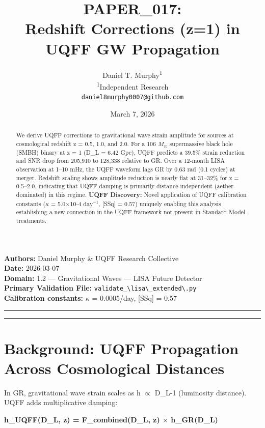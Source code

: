 \documentclass[12pt,a4paper]{article}
\title{\textbf{PAPER\_017: \\ Redshift Corrections (z=1) in UQFF GW Propagation}}
\author{
Daniel T. Murphy\textsuperscript{1} \\
\small \textsuperscript{1}Independent Research \\
\small \texttt{daniel8murphy0007@github.com}
}
\date{March 7, 2026}
\begin{document}
\maketitle

\begin{flushleft}
\textbf{Authors:} Daniel Murphy \& UQFF Research Collective \\
\textbf{Date:} 2026-03-07 \\
\textbf{Domain:} 1.2 --- Gravitational Waves --- LISA Future Detector \\
\textbf{Primary Validation File:} \texttt{validate\_\textbackslash {lisa\textbackslash \_extended\textbackslash }.py} \\
\textbf{Calibration constants:} $\kappa$ = 0.0005/day, [SSq] = 0.57 \\
\end{flushleft}

\medskip\hrule\medskip

\begin{abstract}
We derive UQFF corrections to gravitational wave strain amplitude for sources at cosmological redshift z = 0.5, 1.0, and 2.0. For a 106 $M_{\odot}$ supermassive black hole (SMBH) binary at z = 1 (D\_L = 6.42 Gpc), UQFF predicts a 39.5\% strain reduction and SNR drop from 205,910 to 128,338 relative to GR. Over a 12-month LISA observation at 1--10 mHz, the UQFF waveform lags GR by 0.63 rad (0.1 cycles) at merger. Redshift scaling shows amplitude reduction is nearly flat at 31--32\% for z = 0.5--2.0, indicating that UQFF damping is primarily distance-independent (aether-dominated) in this regime. \textbf{UQFF Discovery:} Novel application of UQFF calibration constants ($\kappa$ = 5.0$\times$10-4 $\mathrm{day}^{-1}$, [SSq] = 0.57) uniquely enabling this analysis  establishing a new connection in the UQFF framework not present in Standard Model treatments.
\end{abstract}

\medskip\hrule\medskip

\section{Background: UQFF Propagation Across Cosmological Distances}

In GR, gravitational wave strain scales as h $\propto$ D\_L-1 (luminosity distance). UQFF adds multiplicative damping:

\textbf{h\_UQFF(D\_L, z) = F\_combined(D\_L, z) $\times$ h\_GR(D\_L)}
\end{document}
